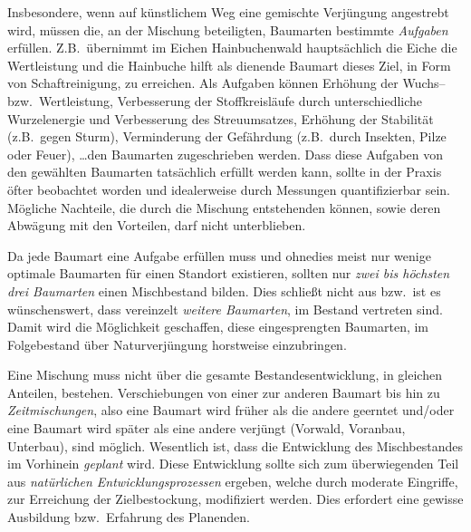 \documentclass[twocolumn]{scrartcl}
\begin{document}
Insbesondere, wenn auf künstlichem Weg eine gemischte Verjüngung
angestrebt wird, müssen die, an der Mischung beteiligten, Baumarten
bestimmte \emph{Aufgaben} erfüllen. Z.B.\ übernimmt im Eichen
Hainbuchenwald hauptsächlich die Eiche die Wertleistung und die
Hainbuche hilft als dienende Baumart dieses Ziel, in Form von
Schaftreinigung, zu erreichen. Als Aufgaben können Erhöhung der
Wuchs-- bzw.\ Wertleistung, Verbesserung der Stoffkreisläufe durch
unterschiedliche Wurzelenergie und Verbesserung des Streuumsatzes,
Erhöhung der Stabilität (z.B.\ gegen Sturm), Verminderung der
Gefährdung (z.B.\ durch Insekten, Pilze oder Feuer), \dots den
Baumarten zugeschrieben werden. Dass diese Aufgaben von den gewählten
Baumarten tatsächlich erfüllt werden kann, sollte in der Praxis öfter
beobachtet worden und idealerweise durch Messungen quantifizierbar
sein. Mögliche Nachteile, die durch die Mischung entstehenden können,
sowie deren Abwägung mit den Vorteilen, darf nicht unterblieben.

Da jede Baumart eine Aufgabe erfüllen muss und ohnedies meist nur
wenige optimale Baumarten für einen Standort existieren, sollten nur
\emph{zwei bis höchsten drei Baumarten} einen Mischbestand
bilden. Dies schließt nicht aus bzw.\ ist es wünschenswert, dass
vereinzelt \emph{weitere Baumarten}, im Bestand vertreten sind. Damit
wird die Möglichkeit geschaffen, diese eingesprengten Baumarten, im
Folgebestand über Naturverjüngung horstweise einzubringen.

Eine Mischung muss nicht über die gesamte Bestandesentwicklung, in
gleichen Anteilen, bestehen. Verschiebungen von einer zur anderen
Baumart bis hin zu \emph{Zeitmischungen}, also eine Baumart wird
früher als die andere geerntet und/oder eine Baumart wird später als
eine andere verjüngt (Vorwald, Voranbau, Unterbau), sind
möglich. Wesentlich ist, dass die Entwicklung des Mischbestandes im
Vorhinein \emph{geplant} wird. Diese Entwicklung sollte sich zum
überwiegenden Teil aus \emph{natürlichen Entwicklungsprozessen}
ergeben, welche durch moderate Eingriffe, zur Erreichung der
Zielbestockung, modifiziert werden. Dies erfordert eine gewisse
Ausbildung bzw.\ Erfahrung des Planenden.
\end{document}
